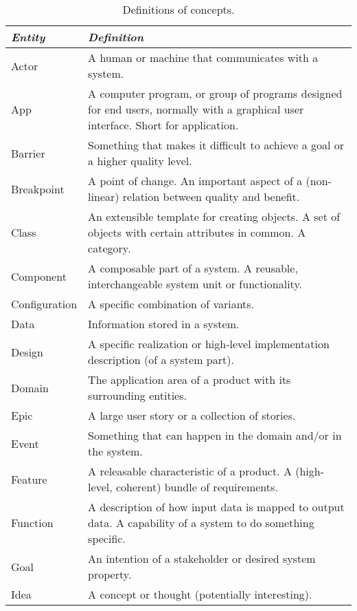 \documentclass[a4paper]{llncs}
\begin{document}
\clearpage
\hspace{-0.5cm}
\begin{minipage}{1\linewidth}
\begin{minipage}{0.36\textwidth} 
\begin{table}[H]
\vspace{-0.7cm}
\fontsize{6}{6.5}\selectfont
\caption{Definitions of concepts.}%
\label{table-entities}
\begin{tabular}{|l p{5.0cm}|}
\hline
\textit{Entity} & \textit{Definition}  \\ \hline
Actor&A human or machine that communicates with a system.\\
App&A computer program, or group of programs designed for end users, normally with a graphical user interface. Short for application.\\
Barrier&Something that makes it difficult to achieve a goal or a higher quality level.\\
Breakpoint&A point of change. An important aspect of a (non-linear) relation between quality and benefit.\\
Class&An extensible template for creating objects. A set of objects with certain attributes in common. A category.\\
Component&A composable part of a system. A reusable, interchangeable system unit or functionality.\\
Configuration&A specific combination of variants.\\
Data&Information stored in a system.\\
Design&A specific realization or high-level implementation description (of a system part).\\
Domain&The application area of a product with its surrounding entities.\\
Epic&A large user story or a collection of stories.\\
Event&Something that can happen in the domain and/or in the system.\\
Feature&A releasable characteristic of a product. A (high-level, coherent) bundle of requirements.\\
Function&A description of how input data is mapped to output data. A capability of a system to do something specific.\\
Goal&An intention of a stakeholder or desired system property.\\
Idea&A concept or thought (potentially interesting).\\

\end{tabular}
\end{table}
\end{minipage}
\end{minipage}
\end{document}
